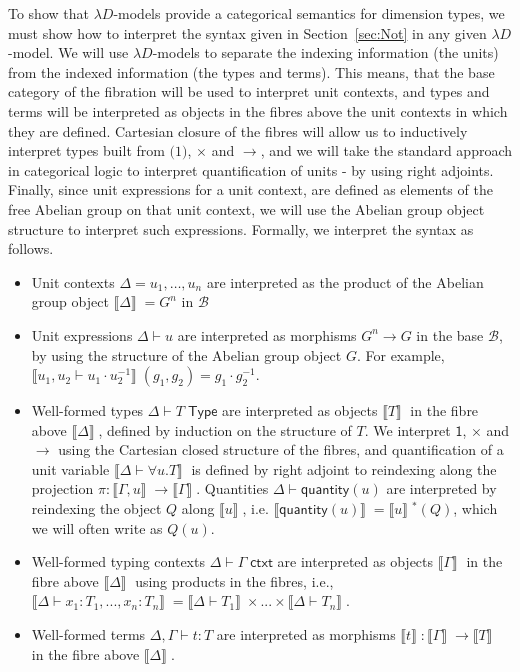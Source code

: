 \documentclass[a4paper,UKenglish]{lipics}
\newcommand{\ra}{\rightarrow}
\newcommand{\msf}[1]{\mathsf{#1}} %
\newcommand{\B}{\mathcal{B}}
\newcommand{\sem}[1]{\ensuremath{\llbracket #1 \rrbracket} \;}
\newcommand{\qnt}{\msf{quantity}}
\begin{document}
To show that $\lambda D$-models provide a categorical semantics for dimension types, we must show how to interpret the syntax given in Section~\ref{sec:Not} in any given $\lambda D$-model. We will use $\lambda D$-models to separate the indexing information (the units) from the indexed information (the types and terms). This means, that the base category of the fibration will be used to interpret unit contexts, and types and terms will be interpreted as objects in the fibres above the unit contexts in which they are defined. Cartesian closure of the fibres will allow us to inductively interpret types built from $\msf(1)$, $\times$ and $\rightarrow$, and we will take the standard approach in categorical logic to interpret quantification of units - by using right adjoints. Finally, since unit expressions for a unit context, are defined as elements of the free Abelian group on that unit context, we will use the Abelian group object structure to interpret such expressions. Formally, we interpret the syntax as follows.


\begin{itemize}
\item Unit contexts $\Delta = u_1, \ldots, u_n$ are interpreted as the product of the Abelian group object $\sem{\Delta} = G^n$ in $\B$
\item Unit expressions $\Delta\vdash u$ are interpreted as morphisms $G^n \ra G$ in the base $\B$, by using the structure of the Abelian group object $G$. For example, $\sem{u_1, u_2 \vdash u_1 \cdot u_2^{-1}}(g_1,g_2) = g_1 \cdot g_2^{-1}$.

\item Well-formed types $\Delta \vdash T \; \msf{ Type}$ are interpreted as objects $\sem{T}$ in the fibre above $\sem{\Delta}$,  defined by induction on the structure of $T$. We interpret $\msf{1}$, $\times$ and $\rightarrow$ using the Cartesian closed structure of the fibres, and quantification of a unit variable $\sem{\Delta \vdash \forall u. T}$ is defined by right adjoint to reindexing along the projection $\pi: \sem{\Gamma, u} \rightarrow \sem{\Gamma}$. Quantities $\Delta \vdash \qnt(u)$ are interpreted by reindexing the object $Q$ along $\sem{u}$, i.e. $\sem{\qnt(u)} = \sem{u}^\ast (Q)$, which we will often write as $Q(u)$.

\item Well-formed typing contexts $\Delta \vdash \Gamma \; \msf{ ctxt}$ are interpreted as objects $\sem{\Gamma}$ in the fibre above $\sem{\Delta}$ using products in the fibres, i.e., \\$\sem{\Delta \vdash x_1 : T_1 ,..., x_n:T_n} = \sem{\Delta \vdash T_1} \times ... \times \sem{\Delta \vdash T_n}$.

\item Well-formed terms $\Delta, \Gamma \vdash t : T$ are interpreted as morphisms $\sem{t} : \sem{\Gamma} \ra \sem{T}$ in the fibre above $\sem{\Delta}$.
\end{itemize}
\end{document}
